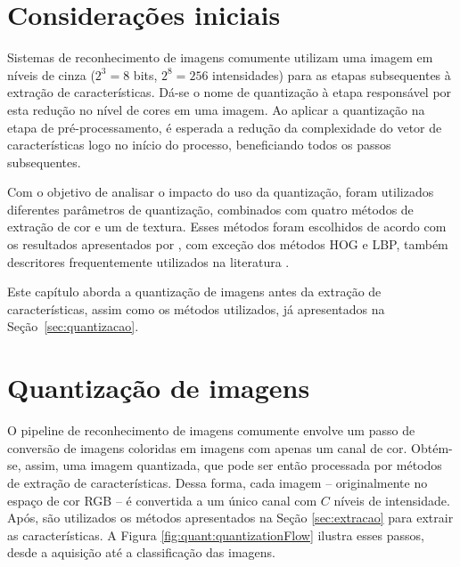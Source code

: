\section{Considerações iniciais}

Sistemas de reconhecimento de imagens comumente utilizam uma imagem em níveis de cinza ($2^3 = 8$ bits, $2^8 = 256$ intensidades) para as etapas subsequentes à extração de características. Dá-se o nome de quantização à etapa responsável por esta redução no nível de cores em uma imagem. Ao aplicar a quantização na etapa de pré-processamento, é esperada a redução da complexidade do vetor de características logo no início do processo, beneficiando todos os passos subsequentes.

Com o objetivo de analisar o impacto do uso da quantização, foram utilizados diferentes parâmetros de quantização, combinados com quatro métodos de extração de cor e um de textura. Esses métodos foram escolhidos de acordo com os resultados apresentados por , com exceção dos métodos HOG e LBP, também descritores frequentemente utilizados na literatura \cite{Wang2009a}.

Este capítulo aborda a quantização de imagens antes da extração de características, assim como os métodos utilizados, já apresentados na Seção~\ref{sec:quantizacao}.

\section{Quantização de imagens}

O pipeline de reconhecimento de imagens comumente envolve um passo de conversão de imagens coloridas em imagens com apenas um canal de cor. Obtém-se, assim, uma imagem quantizada, que pode ser então processada por métodos de extração de características. Dessa forma, cada imagem -- originalmente no espaço de cor RGB -- é convertida a um único canal com $C$ níveis de intensidade. Após, são utilizados os métodos apresentados na Seção \ref{sec:extracao} para extrair as características. A Figura \ref{fig:quant:quantizationFlow} ilustra esses passos, desde a aquisição até a classificação das imagens.

